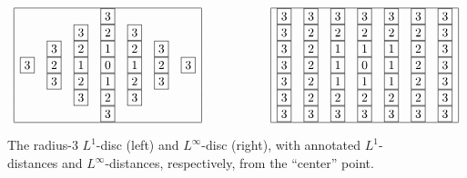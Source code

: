 \begin{figure}[hbt]
\[
\begin{array}{ccc}
\begin{array}{|ccccccc|}
\hline
  &   &   & \fbox{3} &   &   &   \\
  &   & \fbox{3} & \fbox{2} & \fbox{3} &   &   \\
  & \fbox{3} & \fbox{2} & \fbox{1} & \fbox{2} & \fbox{3} &   \\
\fbox{3} & \fbox{2} & \fbox{1} & \fbox{0} & \fbox{1} & \fbox{2} & \fbox{3} \\
  & \fbox{3} & \fbox{2} & \fbox{1} & \fbox{2} & \fbox{3} &   \\
  &   & \fbox{3} & \fbox{2} & \fbox{3} &   &   \\
  &   &   & \fbox{3} &   &   &   \\
\hline
\end{array}
  & \hspace*{.5in} &
\begin{array}{|ccccccc|}
\hline
\fbox{3} & \fbox{3} & \fbox{3} & \fbox{3} & \fbox{3} & \fbox{3} & \fbox{3} \\
\fbox{3} & \fbox{2} & \fbox{2} & \fbox{2} & \fbox{2} & \fbox{2} & \fbox{3} \\
\fbox{3} & \fbox{2} & \fbox{1} & \fbox{1} & \fbox{1} & \fbox{2} & \fbox{3} \\
\fbox{3} & \fbox{2} & \fbox{1} & \fbox{0} & \fbox{1} & \fbox{2} & \fbox{3} \\
\fbox{3} & \fbox{2} & \fbox{1} & \fbox{1} & \fbox{1} & \fbox{2} & \fbox{3} \\
\fbox{3} & \fbox{2} & \fbox{2} & \fbox{2} & \fbox{2} & \fbox{2} & \fbox{3} \\
\fbox{3} & \fbox{3} & \fbox{3} & \fbox{3} & \fbox{3} & \fbox{3} & \fbox{3} \\
\hline
\end{array}
\end{array}
\]
\caption{The radius-$3$ $L^1$-disc (left) and $L^\infty$-disc (right), with annotated $L^1$-distances and $L^\infty$-distances, respectively, from the ``center'' point.}
\label{fig:Ln-discs}
\end{figure}

\medskip

 
 

